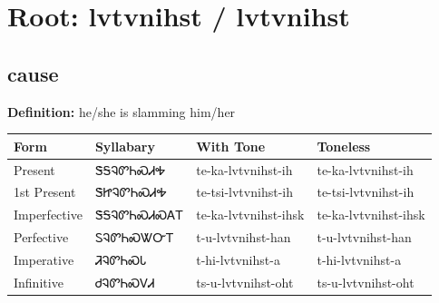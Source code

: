 \documentclass{article}%
\begin{document}
%
\normalsize%
\section*{Root: lvtvnihst / lvtvnihst}%
\subsection*{cause}%
\textbf{Definition: }%
he/she is slamming him/her%
\\[0.5em]%
\begin{tabular}{|l|l|l|l|}%
\hline%
\textbf{Form}&\textbf{Syllabary}&\textbf{With Tone}&\textbf{Toneless}\\%
\hline%
Present&ᏕᎦᎸᏛᏂᏍᏗᎭ&te{-}ka{-}lvtvnihst{-}ih&te{-}ka{-}lvtvnihst{-}ih\\%
1st Present&ᏕᏥᎸᏛᏂᏍᏗᎭ&te{-}tsi{-}lvtvnihst{-}ih&te{-}tsi{-}lvtvnihst{-}ih\\%
Imperfective&ᏕᎦᎸᏛᏂᏍᏗᏍᎪᎢ&te{-}ka{-}lvtvnihst{-}ihsk&te{-}ka{-}lvtvnihst{-}ihsk\\%
Perfective&ᏚᎸᏛᏂᏍᏔᏅᎢ&t{-}u{-}lvtvnihst{-}han&t{-}u{-}lvtvnihst{-}han\\%
Imperative&ᏘᎸᏛᏂᏍᏓ&t{-}hi{-}lvtvnihst{-}a&t{-}hi{-}lvtvnihst{-}a\\%
Infinitive&ᏧᎸᏛᏂᏍᏙᏗ&ts{-}u{-}lvtvnihst{-}oht&ts{-}u{-}lvtvnihst{-}oht\\%
\hline%
\end{tabular}%
\\[1em]%
\end{document}
